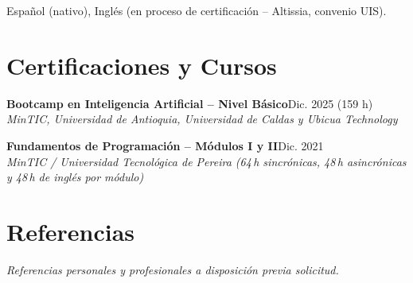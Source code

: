 \documentclass[10pt,a4paper]{article}
\newcommand{\entrada}[3]{%
    \noindent\textbf{\color{primario}#1}\hfill{\small\color{secundario}#2}\\[0pt]
    {\small\itshape\color{secundario}#3}\par\vspace{1pt}%
}
\newcommand{\subentrada}[2]{%
    \noindent{\small\bfseries\color{texto}#1}\hfill{\small\color{secundario}#2}\par\vspace{1pt}%
}
\begin{document}
\subentrada{Idiomas}{}
{\small\color{texto} Español (nativo), Inglés (en proceso de certificación -- Altissia, convenio UIS).}

\section*{Certificaciones y Cursos}
\entrada{Bootcamp en Inteligencia Artificial -- Nivel Básico}{Dic. 2025 (159 h)}{MinTIC, Universidad de Antioquia, Universidad de Caldas y Ubicua Technology}
\entrada{Fundamentos de Programación -- Módulos I y II}{Dic. 2021}{MinTIC / Universidad Tecnológica de Pereira (64\,h sincrónicas, 48\,h asincrónicas y 48\,h de inglés por módulo)}

\vspace{2pt}
\section*{Referencias}
{\small\color{secundario}\textit{Referencias personales y profesionales a disposición previa solicitud.}}
\end{document}
